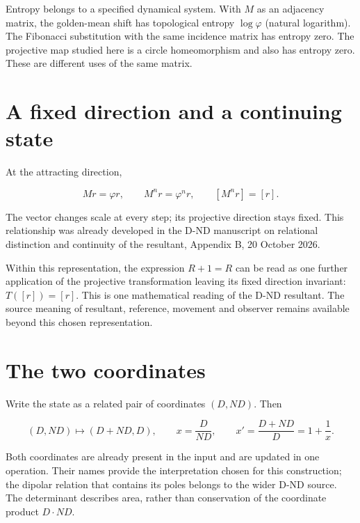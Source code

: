 \documentclass[10pt,a4paper]{article}
\begin{document}
Entropy belongs to a specified dynamical system. With $M$ as an adjacency matrix, the golden-mean shift has topological entropy $\log\varphi$ (natural logarithm). The Fibonacci substitution with the same incidence matrix has entropy zero. The projective map studied here is a circle homeomorphism and also has entropy zero. These are different uses of the same matrix.
\par

\section*{A fixed direction and a continuing state}

At the attracting direction,
\par

\[
Mr=\varphi r,\qquad M^nr=\varphi^nr,\qquad [M^nr]=[r].
\]

The vector changes scale at every step; its projective direction stays fixed. This relationship was already developed in the D-ND manuscript on relational distinction and continuity of the resultant, Appendix B, 20 October 2026.
\par

Within this representation, the expression $R+1=R$ can be read as one further application of the projective transformation leaving its fixed direction invariant: $T([r])=[r]$. This is one mathematical reading of the D-ND resultant. The source meaning of resultant, reference, movement and observer remains available beyond this chosen representation.
\par

\section*{The two coordinates}

Write the state as a related pair of coordinates $(D,ND)$. Then
\par

\[
(D,ND)\longmapsto(D+ND,D),\qquad x=\frac D{ND},\qquad x'=\frac{D+ND}{D}=1+\frac1x.
\]

Both coordinates are already present in the input and are updated in one operation. Their names provide the interpretation chosen for this construction; the dipolar relation that contains its poles belongs to the wider D-ND source. The determinant describes area, rather than conservation of the coordinate product $D\cdot ND$.
\par
\end{document}
